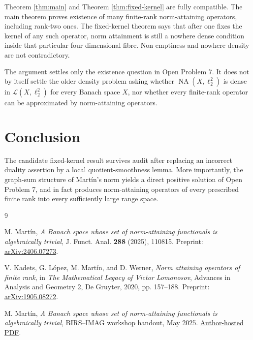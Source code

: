 \documentclass[11pt]{article}
\theoremstyle{definition}
\newcommand{\NA}{\operatorname{NA}}
\newcommand{\calL}{\mathcal L}
\begin{document}
Theorem \ref{thm:main} and Theorem \ref{thm:fixed-kernel} are fully
compatible.  The main theorem proves existence of many finite-rank
norm-attaining operators, including rank-two ones.  The fixed-kernel theorem
says that after one fixes the kernel of any such operator, norm attainment is
still a nowhere dense condition inside that particular four-dimensional
fibre.  Non-emptiness and nowhere density are not contradictory.

The argument settles only the existence question in Open Problem 7.  It does
not by itself settle the older density problem asking whether
\(\NA(X,\ell_2^2)\) is dense in \(\calL(X,\ell_2^2)\) for every Banach space
\(X\), nor whether every finite-rank operator can be approximated by
norm-attaining operators.

\section*{Conclusion}

The candidate fixed-kernel result survives audit after replacing an incorrect
duality assertion by a local quotient-smoothness lemma.  More importantly,
the graph-sum structure of Mart\'in's norm yields a direct positive solution of
Open Problem 7, and in fact produces norm-attaining operators of every
prescribed finite rank into every sufficiently large range space.

\begin{thebibliography}{9}

M. Mart\'in,
\emph{A Banach space whose set of norm-attaining functionals is algebraically
trivial},
J. Funct. Anal. \textbf{288} (2025), 110815.
Preprint: \href{https://arxiv.org/abs/2406.07273}{arXiv:2406.07273}.

V. Kadets, G. L\'opez, M. Mart\'in, and D. Werner,
\emph{Norm attaining operators of finite rank},
in \emph{The Mathematical Legacy of Victor Lomonosov},
Advances in Analysis and Geometry 2, De Gruyter, 2020, pp. 157--188.
Preprint: \href{https://arxiv.org/abs/1905.08272}{arXiv:1905.08272}.

M. Mart\'in,
\emph{A Banach space whose set of norm-attaining functionals is algebraically
trivial}, BIRS--IMAG workshop handout, May 2025.
\href{https://www.ugr.es/~mmartins/Curriculum/Charlas/2025_BIRS_handout.pdf}
{Author-hosted PDF}.

\end{thebibliography}
\end{document}

